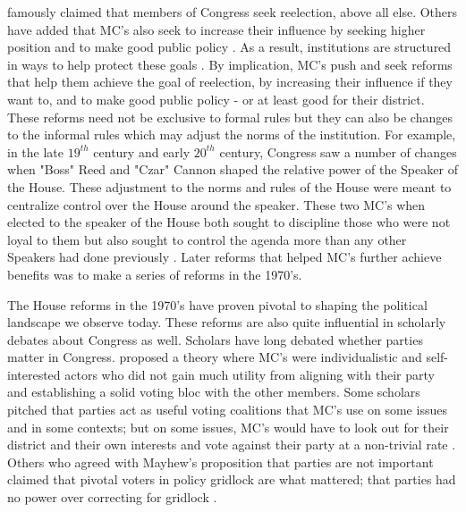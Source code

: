 \documentclass [12pt]{article}
\begin{document}
 famously claimed that members of Congress seek reelection, above all else. Others have added that MC's also seek to increase their influence by seeking higher position and to make good public policy \cite{Fenno1973}. As a result, institutions are structured in ways to help protect these goals \cite{Mayhew1974}. By implication, MC's push and seek reforms that help them achieve the goal of reelection, by increasing their influence if they want to, and to make good public policy - or at least good for their district. These reforms need not be exclusive to formal rules but they can also be changes to the informal rules which may adjust the norms of the institution. For example, in the late $19^{th}$ century and early $20^{th}$ century, Congress saw a number of changes when "Boss" Reed and "Czar" Cannon shaped the relative power of the Speaker of the House. These adjustment to the norms and rules of the House were meant to centralize control over the House around the speaker. These two MC's when elected to the speaker of the House both sought to discipline those who were not loyal to them but also sought to control the agenda more than any other Speakers had done previously \cite{Cox2005}. Later reforms that helped MC's further achieve benefits was to make a series of reforms in the 1970's.

The House reforms in the 1970's have proven pivotal to shaping the political landscape we observe today. These reforms are also quite influential in scholarly debates about Congress as well. Scholars have long debated whether parties matter in Congress.  proposed a theory where MC's were individualistic and self-interested actors who did not gain much utility from aligning with their party and establishing a solid voting bloc with the other members. Some scholars pitched that parties act as useful voting coalitions that MC's use on some issues and in some contexts; but on some issues, MC's would have to look out for their district and their own interests and vote against their party at a non-trivial rate \cite{Aldrich}. Others who agreed with Mayhew's proposition that parties are not important claimed that pivotal voters in policy gridlock are what mattered; that parties had no power over correcting for gridlock \cite{Krehbiel1991}. 
\end{document}
